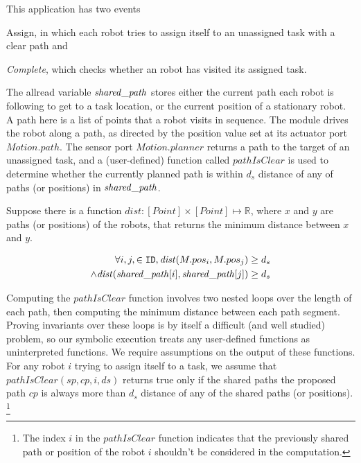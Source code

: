 This application has two events \begin{inparaenum} \item {Assign}, in which each robot tries to assign itself to an unassigned task with a clear path  and \item \emph{Complete}, which checks whether an robot has visited its assigned task. \end{inparaenum} The allread variable $\mathit{shared\_path}$ stores either the current path each robot is following to get to a task location, or the current position of a stationary robot. A path here is a list of points that a robot visits in sequence. The \Motion module drives the robot along a path, as directed by the position value set at its actuator port $\mathit{Motion.path}$. The sensor port $\mathit{Motion.planner}$ returns a path to the target of an unassigned task, and a (user-defined) function called $\mathit{pathIsClear}$ is used to determine whether the currently planned path is within $d_s$ distance of any of paths (or positions) in $\mathit{shared\_path}$.

\newcommand{\dist}{\mathit{dist}}
Suppose there is a function $\dist : [Point] \times [Point] \mapsto \mathbb{R}$, where $x$ and $y$ are paths (or positions) of the robots, that returns the minimum distance between $x$ and $y$.
\begin{invariant}
\label{inv:task}
\[\begin{split}
    \forall i,j, \in \UINS, \dist(M.pos_i, M.pos_j) \geq d_s \\ \land \dist(\pathvar[i], \pathvar[j]) \geq d_s
\end{split}
\]
\end{invariant}
\noindent

Computing the $\mathit{pathIsClear}$ function involves two nested loops over the length of each path, then computing the minimum distance between each path segment. Proving invariants over these loops is by itself a difficult (and well studied) problem, so our symbolic execution treats any user-defined functions as uninterpreted functions. We require assumptions on the output of these functions. For any robot $i$ trying to assign itself to a task, we  assume that $\mathit{pathIsClear}(\mathit{sp}, \mathit{cp} ,i, \mathit{ds})$ returns true only if the shared paths the proposed path $\mathit{cp}$ is always more than $d_s$ distance of any of the shared paths (or positions). \footnote{ The index $i$ in the $\mathit{pathIsClear}$ function indicates that the previously shared path or position of the robot $i$ shouldn't be considered in the computation.}

